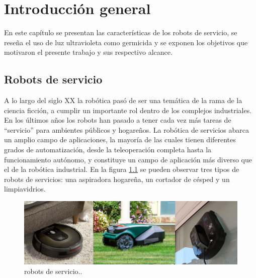 
\chapter{Introducción general} %

\label{Chapter1} %
\label{IntroGeneral}
En este capítulo se presentan las características de los robots de servicio, se  reseña el uso de luz ultravioleta como germicida y se exponen los objetivos que motivaron el presente trabajo y sus respectivo alcance.

\newcommand{\keyword}[1]{\textbf{#1}}
\newcommand{\tabhead}[1]{\textbf{#1}}
\newcommand{\code}[1]{\texttt{#1}}
\newcommand{\file}[1]{\texttt{\bfseries#1}}
\newcommand{\option}[1]{\texttt{\itshape#1}}
\newcommand{\grados}{$^{\circ}$}



\section{Robots de servicio}

A lo largo del siglo XX la robótica pasó de ser una temática de la rama de la ciencia ficción, a cumplir un importante rol dentro de los complejos industriales. En los últimos años los robots han pasado a tener cada vez más tareas de “servicio” para ambientes  públicos y hogareños.
La robótica de servicios abarca un amplio campo de aplicaciones, la mayoría de las cuales tienen diferentes grados de automatización, desde la teleoperación completa hasta la funcionamiento autónomo, y constituye un campo de aplicación más diverso que el de la robótica industrial. En la  figura \ref{fig:robotsservicio} se pueden observar tres tipos de robots de servicios: una aspiradora hogareña, un cortador de césped y un limpiavidrios.

\begin{figure}[h]
	\centering
	\includegraphics[width=\textwidth]{./Figures/robotsservicio.jpg}
	\caption{robots de servicio.\protect\footnotemark.}
	\label{fig:robotsservicio}
\end{figure}


